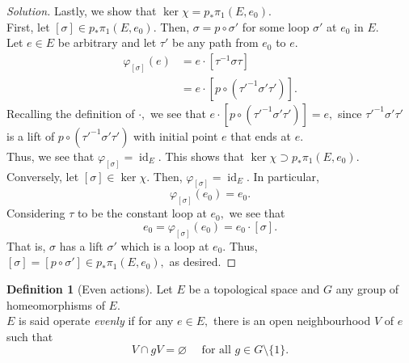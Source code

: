 \documentclass[12pt]{article}
\theoremstyle{definition}
\numberwithin{thm}{section}
\newtheorem{defn}[thm]{Definition}
\let\emptyset\varnothing
\newcommand{\id}{\operatorname{id}}
\newenvironment{soln}{\begin{proof}[Solution]}{\end{proof}}
\begin{document}
\begin{soln}
	Lastly, we show that $\ker\chi = p_*\pi_1(E, e_0).$\\
	First, let $[\sigma] \in p_*\pi_1(E, e_0).$ Then, $\sigma = p\circ\sigma'$ for some loop $\sigma'$ at $e_0$ in $E.$\\
	Let $e \in E$ be arbitrary and let $\tau'$ be any path from $e_0$ to $e.$ \\
	\begin{align*} 
		\varphi_{[\sigma]}(e) &= e\cdot[\tau^{-1}\sigma\tau]\\
		&= e\cdot[p\circ(\tau'^{-1}\sigma'\tau')].
	\end{align*}
	Recalling the definition of $\cdot,$ we see that $e\cdot[p\circ(\tau'^{-1}\sigma'\tau')] = e,$ since $\tau'^{-1}\sigma'\tau'$ is a lift of $p\circ(\tau'^{-1}\sigma'\tau')$ with initial point $e$ that ends at $e.$\\
	Thus, we see that $\varphi_{[\sigma]} = \id_E.$ This shows that $\ker\chi \supset p_*\pi_1(E, e_0).$\\
	Conversely, let $[\sigma] \in \ker\chi.$ Then, $\varphi_{[\sigma]} = \id_E.$ In particular,
	\begin{equation*} 
		\varphi_{[\sigma]}(e_0) = e_0.
	\end{equation*}
	Considering $\tau$ to be the constant loop at $e_0,$ we see that
	\begin{equation*} 
		e_0 = \varphi_{[\sigma]}(e_0) = e_0\cdot[\sigma].
	\end{equation*}
	That is, $\sigma$ has a lift $\sigma'$ which is a loop at $e_0.$ Thus, $[\sigma] = [p\circ\sigma'] \in p_*\pi_1(E, e_0),$ as desired.	
\end{soln}

\begin{defn}[Even actions]
	Let $E$ be a topological space and $G$ any group of homeomorphisms of $E.$\\
	$E$ is said operate \emph{evenly} if for any $e \in E,$ there is an open neighbourhood $V$ of $e$ such that
	\begin{equation*} 
		V \cap gV = \emptyset \quad \text{ for all } g \in G\setminus\{1\}.
	\end{equation*}
\end{defn}
\end{document}
